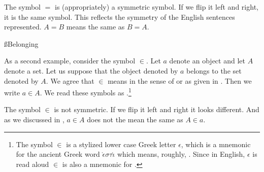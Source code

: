 The symbol $=$ is (appropriately) a symmetric symbol.
If we flip it left and right, it is the same symbol.
This reflects the symmetry of the English sentences represented.
$A = B$ means the same as $B = A$.

%

\ss{Belonging}

As a second example, consider the symbol $\in$.
Let $a$ denote an object and let $A$ denote a set.
Let us suppose that the object denoted by $a$ belongs to the set denoted by $A$.
We agree that $\in$ means  in the sense of  or  as given in .
Then we write $a \in A$.
We read these symbols as .\footnote{The symbol $\in$ is a stylized lower case Greek letter $\epsilon$, which is a mnemonic for the ancient Greek word $\grave{\epsilon} \sigma \tau \acute{\iota}$ which means, roughly, .
Since in English, $\epsilon$ is read aloud  $\in$ is also a mnemonic for .}

The symbol $\in$ is not symmetric.
If we flip it left and right it looks different.
And as we discussed in , $a \in A$ does not the mean the same as $A \in a$.

%
%
%

